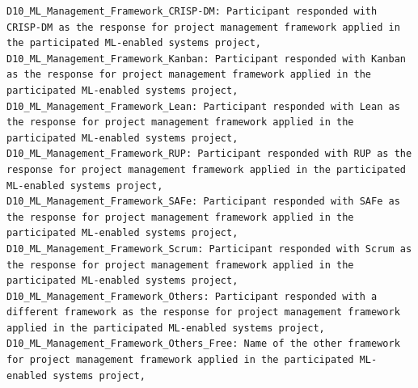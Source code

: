 \begin{verbatim}
D10_ML_Management_Framework_CRISP-DM: Participant responded with CRISP-DM as the response for project management framework applied in the participated ML-enabled systems project,
D10_ML_Management_Framework_Kanban: Participant responded with Kanban as the response for project management framework applied in the participated ML-enabled systems project,  
D10_ML_Management_Framework_Lean: Participant responded with Lean as the response for project management framework applied in the participated ML-enabled systems project,      
D10_ML_Management_Framework_RUP: Participant responded with RUP as the response for project management framework applied in the participated ML-enabled systems project,        
D10_ML_Management_Framework_SAFe: Participant responded with SAFe as the response for project management framework applied in the participated ML-enabled systems project,      
D10_ML_Management_Framework_Scrum: Participant responded with Scrum as the response for project management framework applied in the participated ML-enabled systems project,    
D10_ML_Management_Framework_Others: Participant responded with a different framework as the response for project management framework applied in the participated ML-enabled systems project,
D10_ML_Management_Framework_Others_Free: Name of the other framework for project management framework applied in the participated ML-enabled systems project,


\end{verbatim}

